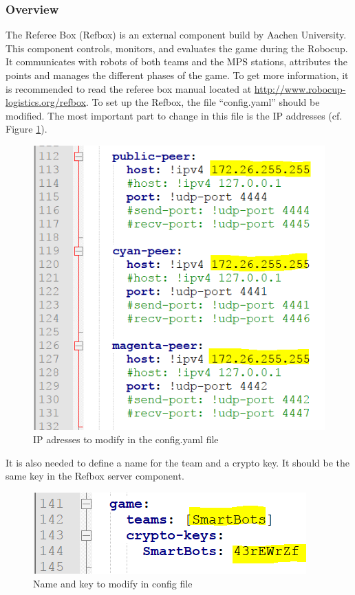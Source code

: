 
\subsubsection{Overview}

The Referee Box (Refbox) is an external component build by Aachen University. This component controls, monitors, and evaluates the game during the Robocup. It communicates with robots of both teams and the MPS stations, attributes the points and manages the different phases of the game. To get more information, it is recommended to read the referee box manual located at \url{http://www.robocup-logistics.org/refbox}. To set up the Refbox, the file “config.yaml” should be modified. The most important part to change in this file is the IP addresses (cf. Figure \ref{fig:configFile1}). \\

\begin{figure}[!h]
\centering
\includegraphics[]{pic/config_file_1.png}
\caption{IP adresses to modify in the config.yaml file}
\label{fig:configFile1}
\end{figure}

It is also needed to define a name for the team and a crypto key. It should be the same key in the Refbox server component. \\

\begin{figure}[!h]
\centering
\includegraphics[]{pic/config_file_2.png}
\caption{Name and key to modify in config file}
\label{fig:configFile2}
\end{figure}

